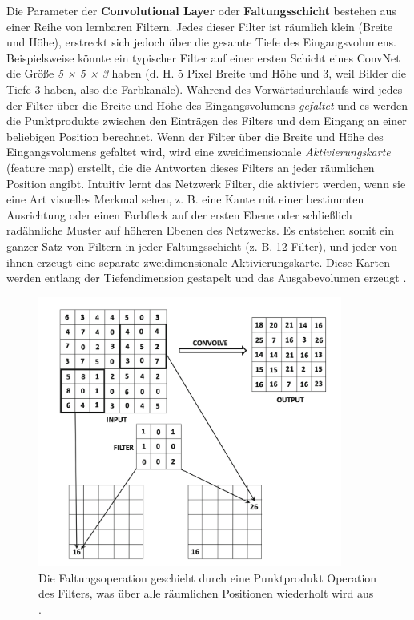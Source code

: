     Die Parameter der  \textbf{Convolutional Layer} oder \textbf{Faltungsschicht} bestehen aus einer Reihe von lernbaren Filtern. Jedes dieser Filter ist räumlich klein (Breite und Höhe), erstreckt sich jedoch über die gesamte Tiefe des Eingangsvolumens. Beispielsweise könnte ein typischer Filter auf einer ersten Schicht eines ConvNet die Größe \textit{5 × 5 × 3} haben (d. H. 5 Pixel Breite und Höhe und 3, weil Bilder die Tiefe 3 haben, also die Farbkanäle). Während des Vorwärtsdurchlaufs wird jedes der Filter über die Breite und Höhe des Eingangsvolumens \textit{gefaltet} und es werden die Punktprodukte zwischen den Einträgen des Filters und dem Eingang an einer beliebigen Position berechnet. Wenn der Filter über die Breite und Höhe des Eingangsvolumens gefaltet wird, wird eine zweidimensionale \textit{Aktivierungskarte} (feature map) erstellt, die die Antworten dieses Filters an jeder räumlichen Position angibt. Intuitiv lernt das Netzwerk Filter, die aktiviert werden, wenn sie eine Art visuelles Merkmal sehen, z. B. eine Kante mit einer bestimmten Ausrichtung oder einen Farbfleck auf der ersten Ebene oder schließlich radähnliche Muster auf höheren Ebenen des Netzwerks. Es entstehen somit ein ganzer Satz von Filtern in jeder Faltungsschicht (z. B. 12 Filter), und jeder von ihnen erzeugt eine separate zweidimensionale Aktivierungskarte. Diese Karten werden entlang der Tiefendimension gestapelt und das Ausgabevolumen erzeugt \cite*{StanfordUniversityCoursecs231n2018a}.

    \begin{figure}[H]
        \centering
        \includegraphics[width=10cm]{kapitel2/conv_layers.png}
        \caption[Die Faltung in einem CNN]{Die Faltungsoperation geschieht durch eine Punktprodukt Operation des Filters, was über alle räumlichen Positionen wiederholt wird aus \cite*[321]{Aggarwal2018}.}
        \label{Kap2:Conv}
    \end{figure}


